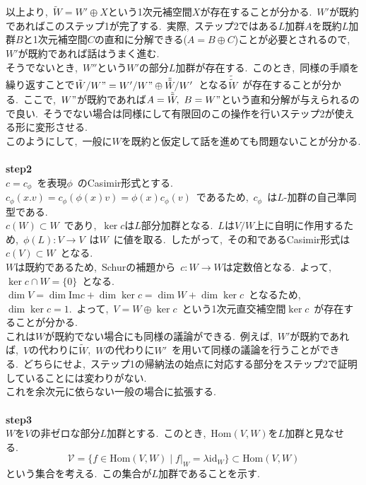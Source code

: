 \documentclass[uplatex,dvipdfmx]{jsarticle}
\begin{document}
\begin{myproof}
    以上より,~$\tilde{W} = W' \oplus X$という1次元補空間$X$が存在することが分かる.~$W'$が既約であればこのステップ1が完了する.~実際,~ステップ2ではある$L$加群$A$を既約$L$加群$B$と1次元補空間$C$の直和に分解できる($A = B \oplus C$)ことが必要とされるので,~$W'$が既約であれば話はうまく進む.\\
    そうでないとき,~$W''$という$W'$の部分$L$加群が存在する.~このとき,~同様の手順を繰り返すことで$\tilde{W}/W" = W'/W" \oplus \tilde{\tilde{W}}/W'$~となる$\tilde{\tilde{W}}$~が存在することが分かる.~ここで,~$W"$が既約であれば$A=\tilde{\tilde{W}},~B = W"$という直和分解が与えられるので良い.~そうでない場合は同様にして有限回のこの操作を行いステップ2が使える形に変形させる.\\
    このようにして,~一般に$W$を既約と仮定して話を進めても問題ないことが分かる.\\\\
    \textbf{step2}\\
    $c = c_\phi$~を表現$\phi$~のCasimir形式とする.~$c_\phi (x.v) = c_\phi (\phi(x)v) = \phi(x) c_\phi (v)$~であるため,~$c_\phi$~は$L$-加群の自己準同型である.\\
    $c(W) \subset W$~であり,~$\ker c$は$L$部分加群となる.~$L$は$V/W$上に自明に作用するため,~$\phi(L): V \to V$~は$W$~に値を取る.~したがって,~その和であるCasimir形式は$c(V) \subset W$~となる.\\
    $W$は既約であるため,~Schurの補題から~$c:W\to W$は定数倍となる.~よって,~$\ker c \cap W = \{0\}$~となる.\\
    $\dim V = \dim \text{Im} c + \dim \ker c = \dim W + \dim \ker c$~となるため,~$\dim \ker c = 1$.~よって,~$V = W \oplus \ker c$~という1次元直交補空間$\ker c$~が存在することが分かる.\\
    これは$W$が既約でない場合にも同様の議論ができる.~例えば,~$W'$が既約であれば,~$V$の代わりに$\tilde{W}$,~$W$の代わりに$W'$~を用いて同様の議論を行うことができる.~どちらにせよ,~ステップ1の帰納法の始点に対応する部分をステップ2で証明していることには変わりがない.\\
    これを余次元に依らない一般の場合に拡張する.\\\\
    \textbf{step3}\\
    $W$を$V$の非ゼロな部分$L$加群とする.~このとき,~$\text{Hom}(V,W)$を$L$加群と見なせる.~
    \begin{equation*}
        \mathcal{V} = \{ f \in \text{Hom}(V,W) \mid f|_W =\lambda \text{id}_W \} \subset \text{Hom}(V,W)
    \end{equation*}
    という集合を考える.~この集合が$L$加群であることを示す.\\

\end{myproof}
\end{document}
